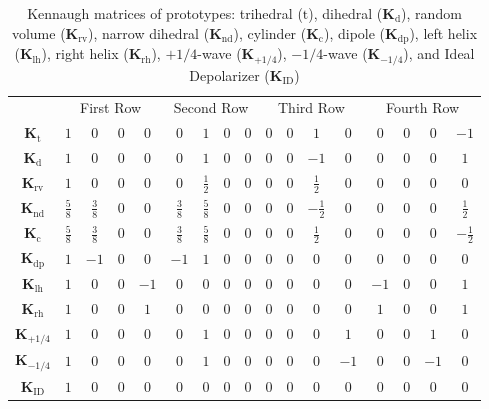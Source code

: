 \documentclass[journal]{IEEEtran}
\begin{document}
\begin{table}[hbt]
	\centering
	\caption{Kennaugh matrices of prototypes: {trihedral} ($\text{t}$), 
		{dihedral} ($\bm{K}_{\text{d}}$), 
		{random volume} ($\bm{K}_{\text{rv}}$), 
		{narrow dihedral} ($\bm{K}_{\text{nd}}$), 
		{cylinder} ($\bm{K}_{\text{c}}$), 
		{dipole} ($\bm{K}_{\text{dp}}$), 
		{left helix} ($\bm{K}_{\text{lh}}$), 
		{right helix} ($\bm{K}_{\text{rh}}$), 
		{$+1/4$-wave} ($\bm{K}_{+1/4}$), 
		{$-1/4$-wave} ($\bm{K}_{-1/4}$),
		and Ideal Depolarizer ($\bm{K}_{\text{ID}}$)}\label{Tab:ElementaryK}
	\setlength{\tabcolsep}{2.7pt}
	\renewcommand{\arraystretch}{1.3}
	\begin{tabular}{*{17}{c}}\toprule
		&	\multicolumn{4}{c}{First Row} 
		& \multicolumn{4}{c}{Second Row} 
		& \multicolumn{4}{c}{Third Row} 
		& \multicolumn{4}{c}{Fourth Row}\\ 
		\cmidrule(rl){2-5} \cmidrule(rl){6-9} \cmidrule(rl){10-13} \cmidrule(rl){14-17} 
		$\bm K_{\text{t}}$
		& $1$ & $0$ & $0$ & $0$
		& $0$ & $1$ & $0$ & $0$
		& $0$ & $0$ & $1$ & $0$
		& $0$ & $0$ & $0$ & $-1$ \\
			$\bm K_{\text{d}}$ &
			$1$ & $0$ & $0$ & $0$
			& $0$ & $1$ & $0$ & $0$
			& $0$ & $0$ & $-1$ & $0$
			& $0$ & $0$ & $0$ & $1$ \\
		$\bm K_{\text{rv}}$ 
			& $1$ & $0$ & $0$ & $0$
			& $0$ & $\frac{1}{2}$ & $0$ & $0$
			& $0$ & $0$ & $\frac{1}{2}$ & $0$
			& $0$ & $0$ & $0$ & $0$\\
		$\bm K_{\text{nd}}$ 
			&$\frac{5}{8}$ & $\frac{3}{8}$ & $0$ & $0$
			& $\frac{3}{8}$ & $\frac{5}{8}$ & $0$ & $0$
			& $0$ & $0$ & $-\frac{1}{2}$ & $0$
			& $0$ & $0$ & $0$ & $\frac{1}{2}$\\
		$\bm K_{\text{c}}$
			& $\frac{5}{8}$ & $\frac{3}{8}$ & $0$ & $0$
			& $\frac{3}{8}$ & $\frac{5}{8}$ & $0$ & $0$
			& $0$ & $0$ & $\frac{1}{2}$ & $0$
			& $0$ & $0$ & $0$ & $-\frac{1}{2}$\\
		$\bm K_\text{dp}$
			& $1$ & $-1$ & $0$ & $0$
			& $-1$ & $1$ & $0$ & $0$
			& $0$ & $0$ & $0$ & $0$
			& $0$ & $0$ & $0$ & $0$\\
		$ \bm K_{\text{lh}}$
		& $1$ & $0$ & $0$ & $-1$
		& $0$ & $0$ & $0$ & $0$
		& $0$ & $0$ & $0$ & $0$
		& $-1$ & $0$ & $0$ & $1$\\
		$ \bm K_{\text{rh}}$
		& $1$ & $0$ & $0$ & $1$
		& $0$ & $0$ & $0$ & $0$
		& $0$ & $0$ & $0$ & $0$
		& $1$ & $0$ & $0$ & $1$\\
		$\bm K_{+1/4}$
			& $1$ & $0$ & $0$ & $0$
			& $0$ & $1$ & $0$ & $0$
			& $0$ & $0$ & $0$ & $1$
			& $0$ & $0$ & $1$ & $0$\\
		$\bm K_{-1/4}$
			& $1$ & $0$ & $0$ & $0$
			& $0$ & $1$ & $0$ & $0$
			& $0$ & $0$ & $0$ & $-1$
			& $0$ & $0$ & $-1$ & $0$\\
		$\bm{K}_{\text{ID}}$
		& $1$ & $0$ & $0$ & $0$
		& $0$ & $0$ & $0$ & $0$
		& $0$ & $0$ & $0$ & $0$
		& $0$ & $0$ & $0$ & $0$ \\
		\bottomrule
	\end{tabular}
\end{table}
\end{document}
